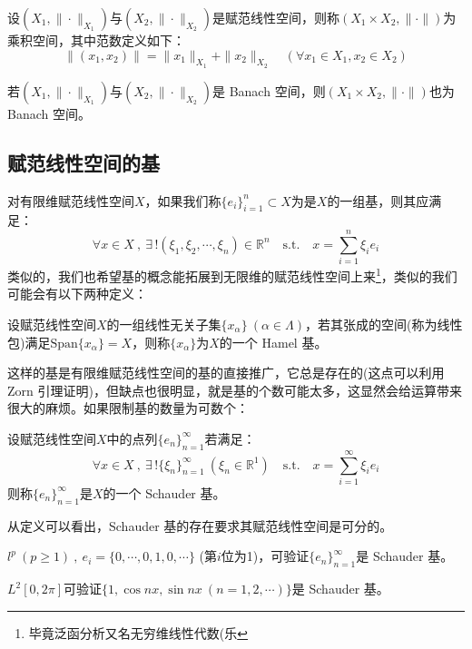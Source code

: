 \begin{definition}[乘积空间]
设$(X_1,\|\cdot\|_{X_1})$与$(X_2,\|\cdot\|_{X_2})$是赋范线性空间，则称$(X_1 \times X_2,\|\cdot\|)$为乘积空间，其中范数定义如下：
\[\|(x_1,x_2)\|=\|x_1\|_{X_1}+\|x_2\|_{X_2} \quad (\forall x_1 \in X_1,x_2 \in X_2)\]
\end{definition}
若$(X_1,\|\cdot\|_{X_1})$与$(X_2,\|\cdot\|_{X_2})$是 Banach 空间，则$(X_1 \times X_2,\|\cdot\|)$也为 Banach 空间。

\subsection{赋范线性空间的基} \label{baseset}
对有限维赋范线性空间$X$，如果我们称$\{e_i\}_{i=1}^n \subset X$为是$X$的一组基，则其应满足：
\[\forall x \in X \ , \ \exists \, ! (\xi_1,\xi_2,\cdots,\xi_n) \in \mathbb{R}^n \quad \text{s.t.} \quad x=\sum_{i=1}^n\xi_ie_i\]
类似的，我们也希望基的概念能拓展到无限维的赋范线性空间上来\footnote{毕竟泛函分析又名无穷维线性代数(乐}，类似的我们可能会有以下两种定义：
\begin{definition}[Hamel 基]
设赋范线性空间$X$的一组线性无关子集$\{x_{\alpha}\} \ (\alpha \in \Lambda)$，若其张成的空间(称为线性包)满足$\text{Span}\{x_{\alpha}\}=X$，则称$\{x_{\alpha}\}$为$X$的一个 Hamel 基。
\end{definition}
这样的基是有限维赋范线性空间的基的直接推广，它总是存在的(这点可以利用 Zorn 引理证明)，但缺点也很明显，就是基的个数可能太多，这显然会给运算带来很大的麻烦。如果限制基的数量为可数个：
\begin{definition}[Schauder 基]
设赋范线性空间$X$中的点列$\{e_n\}_{n=1}^{\infty}$若满足：
\[\forall x \in X \ , \ \exists \, !\{\xi_n\}_{n=1}^{\infty} \ (\xi_n \in \mathbb{R}^1) \quad \text{s.t.} \quad x=\sum_{i=1}^{\infty}\xi_ie_i\]
则称$\{e_n\}_{n=1}^{\infty}$是$X$的一个 Schauder 基。
\end{definition}
从定义可以看出，Schauder 基的存在要求其赋范线性空间是可分的。
\begin{example}
 \quad $l^p \ (p \geq 1) \ , \ e_i=\{0,\cdots,0,1,0,\cdots\}$ (第$i$位为1)，可验证$\{e_n\}_{n=1}^{\infty}$是 Schauder 基。
\end{example}
\begin{example}
\quad $L^2[0,2\pi]$可验证$\{1,\cos nx,\sin nx \ (n=1,2,\cdots)\}$是 Schauder 基。
\end{example}

